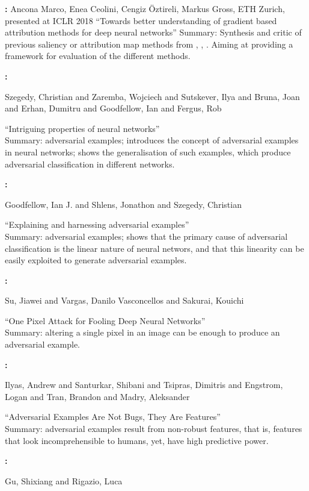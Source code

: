 \textbf{\cite{Ancona2018}:}
Ancona Marco, Enea Ceolini, Cengiz Öztireli, Markus Gross, ETH Zurich, presented at ICLR 2018
``Towards better understanding of gradient based attribution methods for deep neural networks''
Summary: Synthesis and critic of previous saliency or attribution map methods from \cite{Simonyan2014},
\cite{Sundararajan2017}, \cite{Shrikumar2017}. Aiming at providing a framework for evaluation of the different methods.


\textbf{\cite{Szegedy2014}:}

Szegedy, Christian and Zaremba, Wojciech and Sutskever, Ilya and Bruna, Joan and Erhan, Dumitru and Goodfellow, Ian and Fergus, Rob

``Intriguing properties of neural networks''\\
Summary: adversarial examples; introduces the concept of adversarial examples in neural networks; shows the generalisation of such examples, which produce adversarial classification in different networks.


\textbf{\cite{Goodfellow2014}:}

Goodfellow, Ian J. and Shlens, Jonathon and Szegedy, Christian

``Explaining and harnessing adversarial examples''\\
Summary: adversarial examples; shows that the primary cause of adversarial classification is the linear nature of neural networs, and that this linearity can be easily exploited to generate adversarial examples.


\textbf{\cite{Su2019}:}

Su, Jiawei and Vargas, Danilo Vasconcellos and Sakurai, Kouichi

``One Pixel Attack for Fooling Deep Neural Networks''\\
Summary: altering a single pixel in an image can be enough to produce an adversarial example.


\textbf{\cite{Ilyas2019}:}

Ilyas, Andrew and Santurkar, Shibani and Tsipras, Dimitris and Engstrom, Logan and Tran, Brandon and Madry, Aleksander

``Adversarial Examples Are Not Bugs, They Are Features''\\
Summary: adversarial examples result from non-robust features, that is, features that look incomprehensible to humans, yet, have high predictive power.


\textbf{\cite{Gu2014}:}

Gu, Shixiang and Rigazio, Luca

